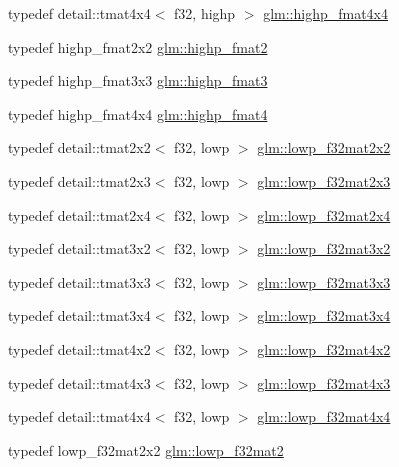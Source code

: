 \begin{DoxyCompactItemize}
\item 
typedef detail\+::tmat4x4$<$ f32, highp $>$ \hyperlink{group__gtc__type__precision_gaf0a98d6caffce89da963d3430e05ddb0}{glm\+::highp\+\_\+fmat4x4}
\item 
typedef highp\+\_\+fmat2x2 \hyperlink{group__gtc__type__precision_ga10d47be18a81c111a8706d0a6df5b4ea}{glm\+::highp\+\_\+fmat2}
\item 
typedef highp\+\_\+fmat3x3 \hyperlink{group__gtc__type__precision_ga3ff9af2eba26aa6df92aa73e1083e81e}{glm\+::highp\+\_\+fmat3}
\item 
typedef highp\+\_\+fmat4x4 \hyperlink{group__gtc__type__precision_ga4c7c9823ade7c29e29b5a313949ae502}{glm\+::highp\+\_\+fmat4}
\item 
typedef detail\+::tmat2x2$<$ f32, lowp $>$ \hyperlink{group__gtc__type__precision_gae5beaa9212ba199167c7c7088a70b2bd}{glm\+::lowp\+\_\+f32mat2x2}
\item 
typedef detail\+::tmat2x3$<$ f32, lowp $>$ \hyperlink{group__gtc__type__precision_ga7e45acb54ae2e4f5113a05b08eea5812}{glm\+::lowp\+\_\+f32mat2x3}
\item 
typedef detail\+::tmat2x4$<$ f32, lowp $>$ \hyperlink{group__gtc__type__precision_gae0da8e4239df703d44875b49a900c893}{glm\+::lowp\+\_\+f32mat2x4}
\item 
typedef detail\+::tmat3x2$<$ f32, lowp $>$ \hyperlink{group__gtc__type__precision_gadf8ee4630e8d2b6ae72293a7c8dff497}{glm\+::lowp\+\_\+f32mat3x2}
\item 
typedef detail\+::tmat3x3$<$ f32, lowp $>$ \hyperlink{group__gtc__type__precision_ga92f4b130a9651c69361600272f113542}{glm\+::lowp\+\_\+f32mat3x3}
\item 
typedef detail\+::tmat3x4$<$ f32, lowp $>$ \hyperlink{group__gtc__type__precision_ga7f81032f05c8a1b96b33c328f38c72d3}{glm\+::lowp\+\_\+f32mat3x4}
\item 
typedef detail\+::tmat4x2$<$ f32, lowp $>$ \hyperlink{group__gtc__type__precision_ga6eedee3981e5bf150ad7463786d0d694}{glm\+::lowp\+\_\+f32mat4x2}
\item 
typedef detail\+::tmat4x3$<$ f32, lowp $>$ \hyperlink{group__gtc__type__precision_gadd0ff5b09c6ecac83e4e908e3f6478c7}{glm\+::lowp\+\_\+f32mat4x3}
\item 
typedef detail\+::tmat4x4$<$ f32, lowp $>$ \hyperlink{group__gtc__type__precision_gab7a6454e1f5d5c434ff316b139eb0231}{glm\+::lowp\+\_\+f32mat4x4}
\item 
typedef lowp\+\_\+f32mat2x2 \hyperlink{group__gtc__type__precision_gad717448ef1129d7b795ebcfee6c4944c}{glm\+::lowp\+\_\+f32mat2}

\end{DoxyCompactItemize}
